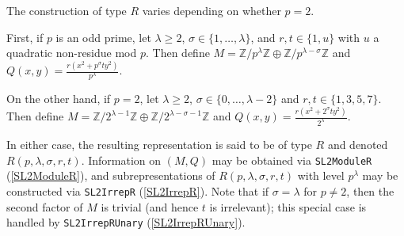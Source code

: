 \documentclass[a4paper,11pt]{report}
\begin{document}
{{{ The construction of type $R$ varies depending on whether $p=2$. 

 First, if $p$ is an odd prime, let $\lambda \geq 2$, $\sigma \in \{1, \dots, \lambda\}$, and $r,t \in \{1,u\}$ with $u$ a quadratic non-residue mod $p$. Then define $M = \mathbb{Z}/p^\lambda\mathbb{Z} \oplus
\mathbb{Z}/p^{\lambda-\sigma}\mathbb{Z}$ and $Q(x,y) = \frac{r(x^2 + p^\sigma t y^2)}{p^\lambda}$. 

 On the other hand, if $p=2$, let $\lambda \geq 2$, $\sigma \in \{0, \dots, \lambda-2\}$ and $r,t \in \{1,3,5,7\}$. Then define $M = \mathbb{Z}/2^{\lambda-1}\mathbb{Z} \oplus
\mathbb{Z}/2^{\lambda-\sigma-1}\mathbb{Z}$ and $Q(x,y) = \frac{r(x^2 + 2^\sigma t y^2)}{2^\lambda}$. 

 In either case, the resulting representation is said to be of type $R$ and denoted $R(p,\lambda,\sigma,r,t)$. Information on $(M,Q)$ may be obtained via \texttt{SL2ModuleR} (\ref{SL2ModuleR}), and subrepresentations of $R(p,\lambda,\sigma,r,t)$ with level $p^\lambda$ may be constructed via \texttt{SL2IrrepR} (\ref{SL2IrrepR}). Note that if $\sigma = \lambda$ for $p \neq 2$, then the second factor of $M$ is trivial (and hence $t$ is irrelevant); this special case is handled by \texttt{SL2IrrepRUnary} (\ref{SL2IrrepRUnary}). }

 }

 }

   
\end{document}
